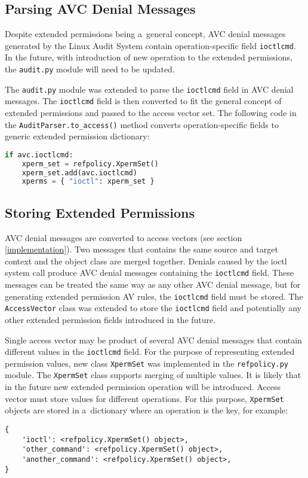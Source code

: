 \subsection{Parsing AVC Denial Messages}
Despite extended permissions being a~general concept, AVC denial messages
generated by the Linux Audit System contain operation-specific field
\texttt{ioctlcmd}. In the future, with introduction of new operation to the
extended permissions, the \texttt{audit.py} module will need to be updated.

The \texttt{audit.py} module was extended to parse the \texttt{ioctlcmd} field
in AVC denial messages. The \texttt{ioctlcmd} field is then converted to fit the
general concept of extended permissions and passed to the access vector set. The
following code in the \texttt{AuditParser.to\_access()} method converts
operation-specific fields to generic extended permission dictionary:
\pagebreak
\begin{lstlisting}[language=Python]
if avc.ioctlcmd:
    xperm_set = refpolicy.XpermSet()
    xperm_set.add(avc.ioctlcmd)
    xperms = { "ioctl": xperm_set }
\end{lstlisting}

\subsection{Storing Extended Permissions}
AVC denial messages are converted to access vectors (see section
\ref{implementation}). Two messages that contains the same source and target
context and the object class are merged together. Denials caused by the ioctl
system call produce AVC denial messages containing the \texttt{ioctlcmd} field.
These messages can be treated the same way as any other AVC denial message, but
for generating extended permission AV rules, the \texttt{ioctlcmd} field must be
stored. The \texttt{AccessVector} class was extended to store the
\texttt{ioctlcmd} field and potentially any other extended permission fields
introduced in the future.

Single access vector may be product of several AVC denial messages that contain
different values in the \texttt{ioctlcmd} field. For the purpose of representing
extended permission values, new class \texttt{XpermSet} was implemented in the
\texttt{refpolicy.py} module. The \texttt{XpermSet} class supports merging of
multiple values. It is likely that in the future new extended permission
operation will be introduced. Access vector must store values for different
operations. For this purpose, \texttt{XpermSet} objects are stored in
a~dictionary where an operation is the key, for example:
\begin{lstlisting}
{
    'ioctl': <refpolicy.XpermSet() object>,
    'other_command': <refpolicy.XpermSet() object>,
    'another_command': <refpolicy.XpermSet() object>,
}
\end{lstlisting}

